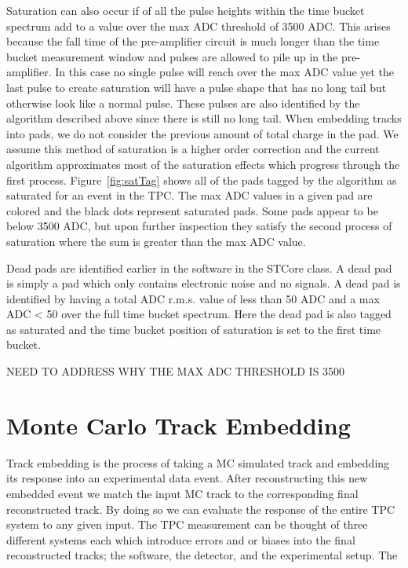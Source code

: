 Saturation can also occur if of all the pulse heights within the time bucket spectrum add to a value over the max ADC threshold of 3500 ADC. This arises because the fall time of the pre-amplifier circuit is much longer than the time bucket measurement window and pulses are allowed to pile up in the pre-amplifier. In this case no single pulse will reach over the max ADC value yet the last pulse to create saturation will have a pulse shape that has no long tail but otherwise look like a normal pulse. These pulses are also identified by the algorithm described above since there is still no long tail. When embedding tracks into pads, we do not consider the previous amount of total charge in the pad. We assume this method of saturation is a higher order correction and the current algorithm approximates most of the saturation effects which progress through the first process.  Figure~\ref{fig:satTag} shows all of the pads tagged by the algorithm as saturated for an event in the TPC. The max ADC values in a given pad are colored and the black dots represent saturated pads. Some pads appear to be below 3500 ADC, but upon further inspection they satisfy the second process of saturation where the sum is greater than the max ADC value.  

Dead pads are identified earlier in the software in the STCore class. A dead pad is simply a pad which only contains electronic noise and no signals. A dead pad is identified by having a total ADC r.m.s. value  of less than 50 ADC and a max ADC < 50 over the full time bucket spectrum. Here the dead pad is also tagged as saturated and the time bucket position of saturation is set to the first time bucket. 

NEED TO ADDRESS WHY THE MAX ADC THRESHOLD IS 3500



\section{Monte Carlo Track Embedding}
\label{sec:embedding}
Track embedding is the process of taking a MC simulated track and embedding its response into an experimental data event. After reconstructing this new embedded event we match the input MC track to the corresponding final reconstructed track.  By doing so we can evaluate the response of the entire TPC system to any given input. The TPC measurement can be thought of three different systems each which introduce errors and or biases into the final reconstructed tracks; the software, the detector, and the experimental setup. The 

